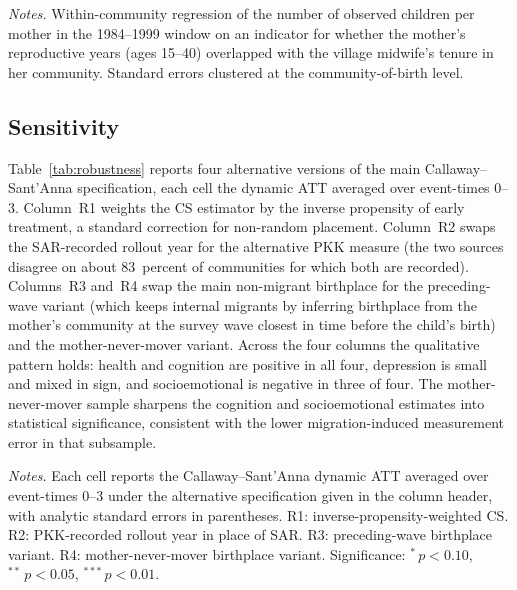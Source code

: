 \begin{table}[!htbp] \centering \caption{Fertility-selection check.} \label{tab:fertility}  \begin{minipage}{0.85\textwidth} \footnotesize \emph{Notes.} Within-community regression of the number of observed children per mother in the 1984--1999 window on an indicator for whether the mother's reproductive years (ages 15--40) overlapped with the village midwife's tenure in her community. Standard errors clustered at the community-of-birth level. \end{minipage} \end{table}

\subsection{Sensitivity}

Table~\ref{tab:robustness} reports four alternative versions of the main Callaway--Sant'Anna specification, each cell the dynamic ATT averaged over event-times $0$--$3$. Column~R1 weights the CS estimator by the inverse propensity of early treatment, a standard correction for non-random placement. Column~R2 swaps the SAR-recorded rollout year for the alternative PKK measure (the two sources disagree on about 83~percent of communities for which both are recorded). Columns~R3 and~R4 swap the main non-migrant birthplace for the preceding-wave variant (which keeps internal migrants by inferring birthplace from the mother's community at the survey wave closest in time before the child's birth) and the mother-never-mover variant. Across the four columns the qualitative pattern holds: health and cognition are positive in all four, depression is small and mixed in sign, and socioemotional is negative in three of four. The mother-never-mover sample sharpens the cognition and socioemotional estimates into statistical significance, consistent with the lower migration-induced measurement error in that subsample.

\begin{table}[!htbp] \centering \caption{Sensitivity to alternative specifications (CS dynamic ATT, event-times 0--3).} \label{tab:robustness} \resizebox{\textwidth}{!}{} \begin{minipage}{0.95\textwidth} \footnotesize \emph{Notes.} Each cell reports the Callaway--Sant'Anna dynamic ATT averaged over event-times $0$--$3$ under the alternative specification given in the column header, with analytic standard errors in parentheses. R1: inverse-propensity-weighted CS. R2: PKK-recorded rollout year in place of SAR. R3: preceding-wave birthplace variant. R4: mother-never-mover birthplace variant. Significance: $^{*}\,p<0.10$, $^{**}\,p<0.05$, $^{***}\,p<0.01$. \end{minipage} \end{table}

